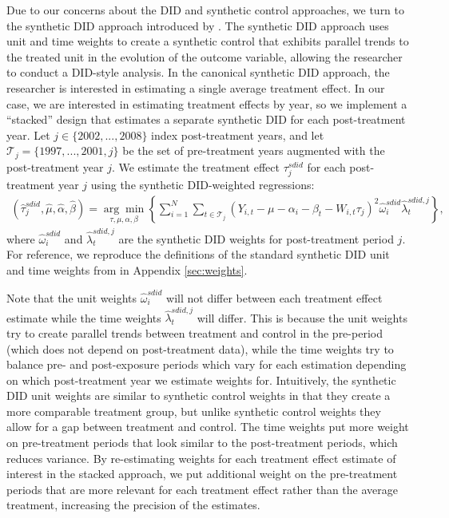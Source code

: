 \documentclass[12pt]{article}
\begin{document}
Due to our concerns about the DID and synthetic control approaches, we turn to the synthetic DID approach introduced by \cite{arkhangelsky2021}.  The synthetic DID approach uses unit and time weights to create a synthetic control that exhibits parallel trends to the treated unit in the evolution of the outcome variable, allowing the researcher to conduct a DID-style analysis. In the canonical synthetic DID approach, the researcher is interested in estimating a single average treatment effect.  In our case, we are interested in estimating treatment effects by year, so we implement a ``stacked'' design that estimates a separate synthetic DID for each post-treatment year.  Let \(j \in \lbrace 2002,...,2008\rbrace\) index post-treatment years, and let \(\mathcal{T}_j =  \lbrace 1997,...,2001,j \rbrace\) be the set of pre-treatment years augmented with the post-treatment year \(j\).  We estimate the treatment effect \(\tau^{sdid}_j\) for each post-treatment year \(j\) using the synthetic DID-weighted regressions:
\begin{align} \label{eq:sdid}
     (\hat{\tau}^{sdid}_j,\hat{\mu},\hat{\alpha},\hat{\beta}) = \underset{\tau,\mu,\alpha,\beta}{\arg\min} \left\lbrace \sum_{i=1}^{N} \sum_{t \in \mathcal{T}_j}  \left( Y_{i,t} - \mu - \alpha_i - \beta_t - W_{i,t} \tau_j \right)^2 \hat{\omega}_i^{sdid} \hat{\lambda}_t^{sdid,j} \right\rbrace,
\end{align}
where \(\hat{\omega}_i^{sdid}\) and  \(\hat{\lambda}_t^{sdid,j}\) are the synthetic DID weights for post-treatment period \(j\).  For reference, we reproduce the definitions of the standard synthetic DID unit and time weights from \cite{arkhangelsky2021} in Appendix \ref{sec:weights}.

Note that the unit weights \(\hat{\omega}_i^{sdid}\) will not differ between each treatment effect estimate while the time weights \(\hat{\lambda}_t^{sdid,j}\) will differ.  This is because the unit weights try to create parallel trends between treatment and control in the pre-period (which does not depend on post-treatment data), while the time weights try to balance pre- and post-exposure periods which vary for each estimation depending on which post-treatment year we estimate weights for.  Intuitively, the synthetic DID unit weights are similar to synthetic control weights in that they create a more comparable treatment group, but unlike synthetic control weights they allow for a gap between treatment and control.  The time weights put more weight on pre-treatment periods that look similar to the post-treatment periods, which reduces variance.  By re-estimating weights for each treatment effect estimate of interest in the stacked approach, we put additional weight on the pre-treatment periods that are more relevant for each treatment effect rather than the average treatment, increasing the precision of the estimates.
\end{document}
